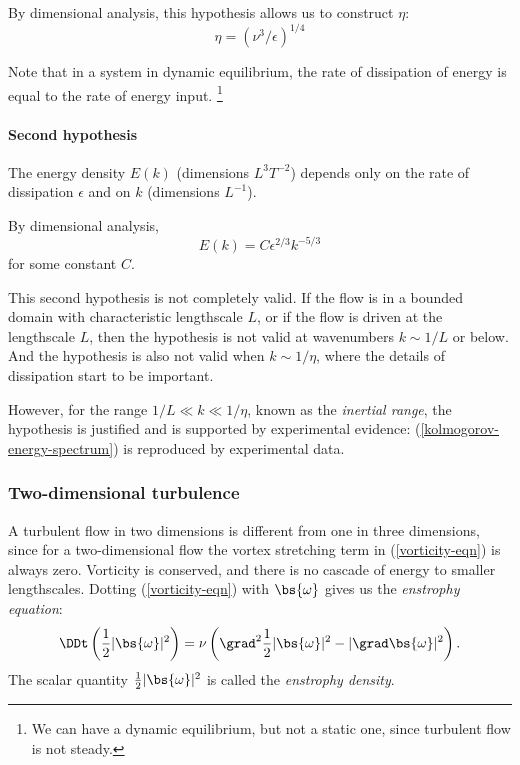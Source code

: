 By dimensional analysis, this hypothesis allows us to construct $\eta$:
\begin{equation}
    \eta = (\nu^3 / \epsilon)^{1/4}
\end{equation}

Note that in a system in dynamic equilibrium, the rate of dissipation of energy is equal to the rate of energy input.
\footnote{We can have a dynamic equilibrium, but not a static one, since turbulent flow is not steady.}

\paragraph{Second hypothesis} The energy density $E(k)$ (dimensions $L^3
T^{-2}$) depends only on the rate of dissipation $\epsilon$ and on $k$
(dimensions $L^{-1}$).

By dimensional analysis,
\begin{equation}
    E(k) = C \epsilon^{2/3} k^{-5/3}
    \label{kolmogorov-energy-spectrum}
\end{equation}
for some constant $C$.

This second hypothesis is not completely valid. If the flow is in a bounded
domain with characteristic lengthscale $L$, or if the flow is driven at the
lengthscale $L$, then the hypothesis is not valid at wavenumbers $k\sim1/L$ or
below. And the hypothesis is also not valid when $k\sim1/\eta$, where the
details of dissipation start to be important.

However, for the range $1/L\ll k\ll 1/\eta$, known as the \textit{inertial
range}, the hypothesis is justified and is supported by experimental evidence:
(\ref{kolmogorov-energy-spectrum}) is reproduced by experimental data. 

\subsubsection{Two-dimensional turbulence}

A turbulent flow in two dimensions is different from one in three dimensions,
since for a two-dimensional flow the vortex stretching term in
(\ref{vorticity-eqn}) is always zero. Vorticity is conserved, and there is no
cascade of energy to smaller lengthscales. Dotting (\ref{vorticity-eqn}) with
$\bs{\omega}$ gives us the \textit{enstrophy equation}:
\begin{equation}
    \DDt\left(\frac{1}{2}|\bs{\omega}|^2\right) 
    = \nu\left(\grad^2\frac{1}{2}|\bs{\omega}|^2 - |\grad\bs{\omega}|^2\right).
 \label{enstrophy-eqn}
\end{equation}
The scalar quantity $\frac{1}{2}|\bs{\omega}|^2$ is called the
\textit{enstrophy density}. 

